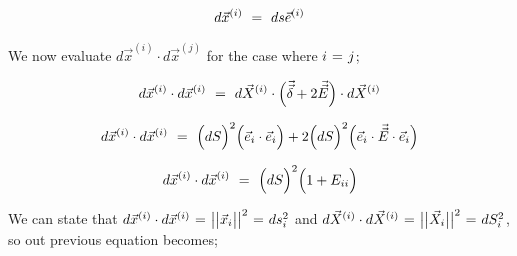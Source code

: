 \documentclass{article}
\begin{document}
\begin{equation} \label{eb-eq-1-81}
d \vec{x}^{( i )}  \hspace{0.125cm} = \hspace{0.125cm} ds  \vec{e}^{( i )} 
\end{equation} 

We now evaluate \begin{math} d \vec{x}^{( i )} \cdot d \vec{x}^{( j )} \end{math} for the case where \begin{math} i \hspace{0.025cm} = \hspace{0.025cm} j \end{math};

\begin{equation} \label{eb-eq-1-82}
d \vec{x}^{( i )} \cdot d \vec{x}^{( i )} \hspace{0.125cm} = \hspace{0.125cm} d \vec{X}^{( i )} \cdot \Big( \vec{\vec{\delta}} + 2 \vec{\vec{E}} \Big) \cdot d \vec{X}^{( i )} 
\end{equation} 

\begin{equation} \label{eb-eq-1-83}
d \vec{x}^{( i )} \cdot d \vec{x}^{( i )} \hspace{0.125cm} = \hspace{0.125cm} \Big( dS \Big)^2 \Big( \vec{e}_i \cdot \vec{e}_i \Big) + 2 \Big( dS \Big)^2  \Big( \vec{e}_i \cdot \vec{\vec{E}} \cdot \vec{e}_i \Big) 
\end{equation} 

\begin{equation} \label{eb-eq-1-84}
d \vec{x}^{( i )} \cdot d \vec{x}^{( i )} \hspace{0.125cm} = \hspace{0.125cm} \Big( dS \Big)^2 \Big( 1 + E_{i i} \Big) 
\end{equation} 

We can state that \begin{math} d \vec{x}^{( i )} \cdot d \vec{x}^{( i )} \hspace{0.025cm} = \hspace{0.025cm} \big| \big| \vec{x}_i \big| \big|^2  \hspace{0.025cm} = \hspace{0.025cm} ds_{i}^{2} \end{math} and \begin{math} d \vec{X}^{( i )} \cdot d \vec{X}^{( i )} \hspace{0.025cm} = \hspace{0.025cm} \big| \big| \vec{X}_i \big| \big|^2  \hspace{0.025cm} = \hspace{0.025cm} dS_{i}^{2} \end{math}, so out previous equation becomes;
\end{document}
